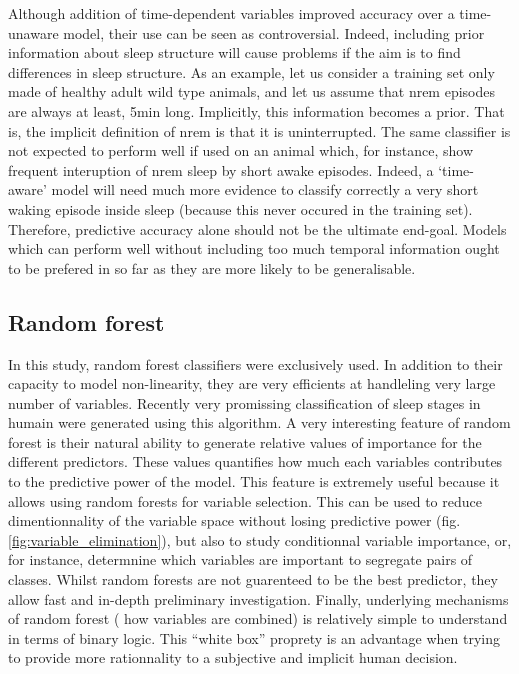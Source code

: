 Although addition of time-dependent variables improved accuracy over a time-unaware model, their use can be seen as controversial.
Indeed, including prior information about sleep structure will cause problems if the aim is to find differences in sleep structure.
As an example, let us consider a training set only made of healthy adult wild type animals,
and let us assume that \gls{nrem} episodes are always at least, 5min long.
Implicitly, this information becomes a prior. That is, the implicit definition of \gls{nrem} is that it 
is uninterrupted.
The same classifier is not expected to perform well if used on an animal which, for instance, show frequent interuption of  \gls{nrem} sleep by short awake episodes.
Indeed, a `time-aware' model will need much more evidence to classify correctly a very short waking episode inside sleep (because this never occured in the training set).
Therefore, predictive accuracy alone should not be the ultimate end-goal. 
Models which can perform well without including too much temporal information ought to be prefered in so far as 
they are more likely to be generalisable.



\subsection{Random forest}

In this study, random forest\citationneeded{} classifiers were exclusively used.
In addition to their capacity to model non-linearity, they are very efficients at handleling very large number of variables. 
Recently very promissing classification of sleep stages in humain were generated using this algorithm\citationneeded{}.
A very interesting feature of random forest is their
natural ability to generate relative values of importance for the different predictors.
These values quantifies how much each variables contributes to the predictive power of the model.
This feature is extremely useful because it allows using random forests for variable selection.
This can be used to reduce dimentionnality of the variable space without losing predictive power (fig.\ref{fig:variable_elimination}),
but also to study conditionnal variable importance, or, for instance,
determnine which variables are important to segregate pairs of classes.
Whilst random forests are not guarenteed to be the best predictor, they allow fast and in-depth preliminary investigation.
Finally, underlying mechanisms of random forest (\ie{} how  variables are combined) is relatively simple to understand in terms of binary logic.
This ``white box'' proprety is an advantage when trying to provide more rationnality to a subjective and implicit human decision.



